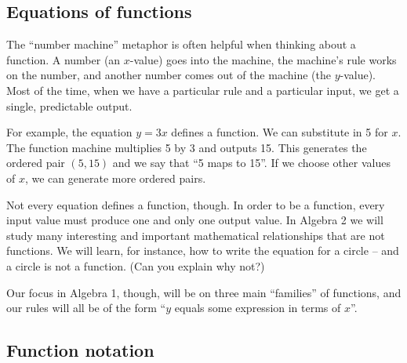 
\subsection{Equations of functions}

The ``number machine'' metaphor is often helpful when thinking about a function. A number (an $x$-value) goes into the machine, the machine's rule works on the number, and another number comes out of the machine (the $y$-value). Most of the time, when we have a particular rule and a particular input, we get a single, predictable output.

For example, the equation $y = 3x$ defines a function. We can substitute in 5 for $x$. The function machine multiplies 5 by 3 and outputs 15. This generates the ordered pair $(5, 15)$ and we say that ``5 maps to 15''. If we choose other values of $x$, we can generate more ordered pairs.

Not every equation defines a function, though. In order to be a function, every input value must produce one and only one output value. In Algebra 2 we will study many interesting and important mathematical relationships that are not functions. We will learn, for instance, how to write the equation for a circle -- and a circle is not a function. (Can you explain why not?)

Our focus in Algebra 1, though, will be on three main ``families'' of functions, and our rules will all be of the form ``$y$ equals some expression in terms of $x$''.


\subsection{Function notation}



